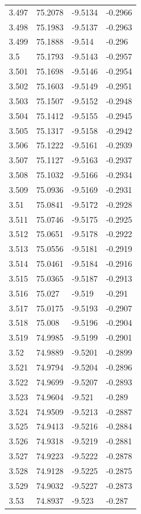 \begin{tabular}{llll}
3.497 & 75.2078 & -9.5134 & -0.2966 \\
3.498 & 75.1983 & -9.5137 & -0.2963 \\
3.499 & 75.1888 & -9.514 & -0.296 \\
3.5 & 75.1793 & -9.5143 & -0.2957 \\
3.501 & 75.1698 & -9.5146 & -0.2954 \\
3.502 & 75.1603 & -9.5149 & -0.2951 \\
3.503 & 75.1507 & -9.5152 & -0.2948 \\
3.504 & 75.1412 & -9.5155 & -0.2945 \\
3.505 & 75.1317 & -9.5158 & -0.2942 \\
3.506 & 75.1222 & -9.5161 & -0.2939 \\
3.507 & 75.1127 & -9.5163 & -0.2937 \\
3.508 & 75.1032 & -9.5166 & -0.2934 \\
3.509 & 75.0936 & -9.5169 & -0.2931 \\
3.51 & 75.0841 & -9.5172 & -0.2928 \\
3.511 & 75.0746 & -9.5175 & -0.2925 \\
3.512 & 75.0651 & -9.5178 & -0.2922 \\
3.513 & 75.0556 & -9.5181 & -0.2919 \\
3.514 & 75.0461 & -9.5184 & -0.2916 \\
3.515 & 75.0365 & -9.5187 & -0.2913 \\
3.516 & 75.027 & -9.519 & -0.291 \\
3.517 & 75.0175 & -9.5193 & -0.2907 \\
3.518 & 75.008 & -9.5196 & -0.2904 \\
3.519 & 74.9985 & -9.5199 & -0.2901 \\
3.52 & 74.9889 & -9.5201 & -0.2899 \\
3.521 & 74.9794 & -9.5204 & -0.2896 \\
3.522 & 74.9699 & -9.5207 & -0.2893 \\
3.523 & 74.9604 & -9.521 & -0.289 \\
3.524 & 74.9509 & -9.5213 & -0.2887 \\
3.525 & 74.9413 & -9.5216 & -0.2884 \\
3.526 & 74.9318 & -9.5219 & -0.2881 \\
3.527 & 74.9223 & -9.5222 & -0.2878 \\
3.528 & 74.9128 & -9.5225 & -0.2875 \\
3.529 & 74.9032 & -9.5227 & -0.2873 \\
3.53 & 74.8937 & -9.523 & -0.287 \\

\end{tabular}
